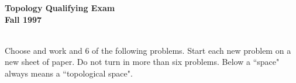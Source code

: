 \documentclass{article}
\begin{document}






\begin{center}\begin{LARGE}
{\bf Topology   Qualifying Exam}\\ 
{\bf Fall 1997}\\ \end{LARGE}
\end{center}
\vspace{0.1in}
\noindent\hrulefill\\

Choose and work and 6 of the following problems. Start each new problem
on a new sheet of paper. Do not turn in more than six problems. Below
a ``space" always means a ``topological space".
\end{document}
